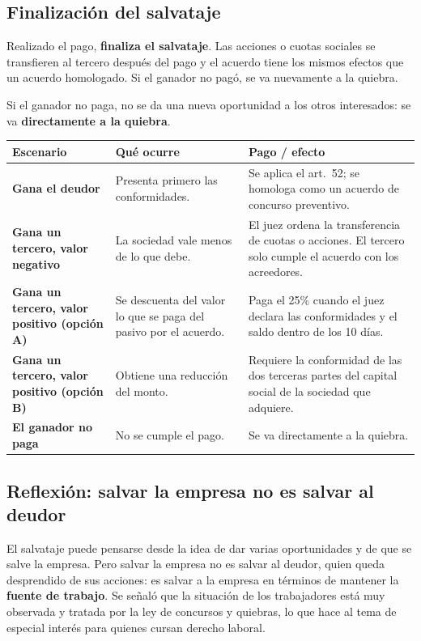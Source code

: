 \documentclass[12pt,oneside]{book}
\begin{document}
\subsection{Finalización del salvataje}

Realizado el pago, \textbf{finaliza el salvataje}. Las acciones o cuotas sociales se transfieren al tercero después del pago y el acuerdo tiene los mismos efectos que un acuerdo homologado. Si el ganador no pagó, se va nuevamente a la quiebra.

\begin{important}
Si el ganador no paga, no se da una nueva oportunidad a los otros interesados: se va \textbf{directamente a la quiebra}.
\end{important}

\begin{table}[H]
\centering
\small
\begin{tabularx}{\textwidth}{@{}>{\raggedright\arraybackslash}p{3.6cm}YY@{}}
\toprule
\textbf{Escenario} & \textbf{Qué ocurre} & \textbf{Pago / efecto} \\
\midrule
\textbf{Gana el deudor} & Presenta primero las conformidades. & Se aplica el art.~52; se homologa como un acuerdo de concurso preventivo. \\
\textbf{Gana un tercero, valor negativo} & La sociedad vale menos de lo que debe. & El juez ordena la transferencia de cuotas o acciones. El tercero solo cumple el acuerdo con los acreedores. \\
\textbf{Gana un tercero, valor positivo (opción A)} & Se descuenta del valor lo que se paga del pasivo por el acuerdo. & Paga el 25\% cuando el juez declara las conformidades y el saldo dentro de los 10 días. \\
\textbf{Gana un tercero, valor positivo (opción B)} & Obtiene una reducción del monto. & Requiere la conformidad de las dos terceras partes del capital social de la sociedad que adquiere. \\
\textbf{El ganador no paga} & No se cumple el pago. & Se va directamente a la quiebra. \\
\bottomrule
\end{tabularx}
\end{table}

\subsection{Reflexión: salvar la empresa no es salvar al deudor}

El salvataje puede pensarse desde la idea de dar varias oportunidades y de que se salve la empresa. Pero salvar la empresa no es salvar al deudor, quien queda desprendido de sus acciones: es salvar a la empresa en términos de mantener la \textbf{fuente de trabajo}. Se señaló que la situación de los trabajadores está muy observada y tratada por la ley de concursos y quiebras, lo que hace al tema de especial interés para quienes cursan derecho laboral.
\end{document}
